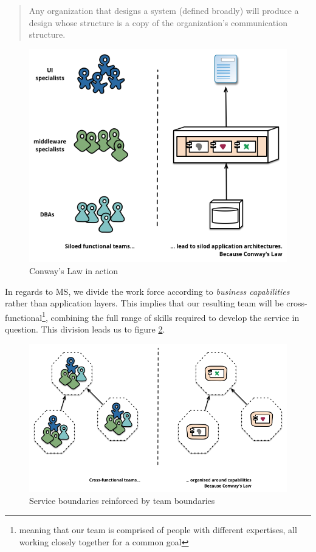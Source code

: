 \begin{quote}
	Any organization that designs a system (defined broadly) will
	produce a design whose structure is a copy of the organization's
	communication structure.  
\end{quote}

\begin{figure}
	\centering
	\includegraphics[width=\linewidth]{images/conways-law.png}
	\caption{Conway's Law in action \cite{ms-definition}}
	\label{fig:conway}
\end{figure}

In regards to MS, we divide the work force according to
\textit{business capabilities} rather than application layers. This
implies that our resulting team will be
cross-functional\footnote{meaning that our team is comprised of people
with different expertises, all working closely together for a common
goal}, combining the full range of skills required to develop the
service in question. This division leads us to figure
\ref{fig:team-boundaries}.

\begin{figure}
	\centering
	\includegraphics[width=\linewidth]{images/PreferFunctionalStaffOrganization.png}
	\caption{Service boundaries reinforced by team boundaries \cite{ms-definition}}
	\label{fig:team-boundaries}
\end{figure}

